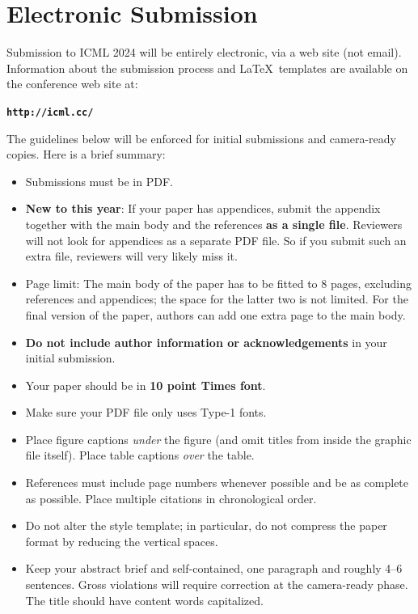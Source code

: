 \documentclass{article}
\theoremstyle{plain}
\theoremstyle{definition}
\theoremstyle{remark}
\begin{document}
\section{Electronic Submission}
\label{submission}

Submission to ICML 2024 will be entirely electronic, via a web site
(not email). Information about the submission process and \LaTeX\ templates
are available on the conference web site at:
\begin{center}
\textbf{\texttt{http://icml.cc/}}
\end{center}

The guidelines below will be enforced for initial submissions and
camera-ready copies. Here is a brief summary:
\begin{itemize}
\item Submissions must be in PDF\@. 
\item \textbf{New to this year}: If your paper has appendices, submit the appendix together with the main body and the references \textbf{as a single file}. Reviewers will not look for appendices as a separate PDF file. So if you submit such an extra file, reviewers will very likely miss it.
\item Page limit: The main body of the paper has to be fitted to 8 pages, excluding references and appendices; the space for the latter two is not limited. For the final version of the paper, authors can add one extra page to the main body.
\item \textbf{Do not include author information or acknowledgements} in your
    initial submission.
\item Your paper should be in \textbf{10 point Times font}.
\item Make sure your PDF file only uses Type-1 fonts.
\item Place figure captions \emph{under} the figure (and omit titles from inside
    the graphic file itself). Place table captions \emph{over} the table.
\item References must include page numbers whenever possible and be as complete
    as possible. Place multiple citations in chronological order.
\item Do not alter the style template; in particular, do not compress the paper
    format by reducing the vertical spaces.
\item Keep your abstract brief and self-contained, one paragraph and roughly
    4--6 sentences. Gross violations will require correction at the
    camera-ready phase. The title should have content words capitalized.
\end{itemize}
\end{document}
